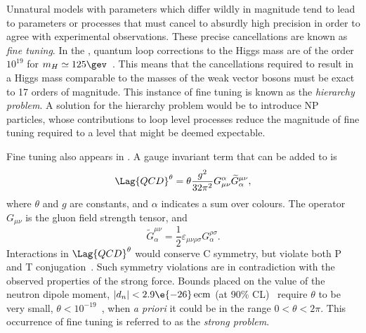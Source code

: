 Unnatural models with parameters which differ wildly in magnitude tend to
lead to parameters or processes that must cancel to absurdly
high precision in order to agree with experimental observations.
These precise cancellations are known as \emph{fine tuning}.
In the \sm, quantum loop corrections to the Higgs mass are of the order $10^{19}$
for $m_H\simeq125\gev$~\cite{Chatrchyan:2012ufa,Aad:2012tfa}.
This means that the cancellations required to result in a Higgs mass comparable to the masses of
the weak vector bosons must be exact to 17 orders of magnitude.
This instance of fine tuning is known as the \emph{hierarchy problem}.
A solution for the hierarchy problem would be to introduce NP particles, whose contributions to
loop level processes reduce the magnitude of fine tuning required to a level that might be deemed
expectable.

Fine tuning also appears in \QCD.
A gauge invariant term that can be added to  is
\begin{equation}
  \Lag{QCD}^\theta = \theta\frac{g^2}{32\pi^2}
  G_{\mu\nu}^\alpha\widetilde G^{\mu\nu}_\alpha,
  \label{eq:strongcp}
\end{equation}
where $\theta$ and $g$ are constants, and $\alpha$ indicates a sum over colours.
The operator $G_{\mu\nu}$ is the gluon field strength tensor, and
\begin{equation}
  \widetilde G^{\mu\nu}_\alpha = \frac12\varepsilon_{\mu\nu\rho\sigma}G^{\rho\sigma}_\alpha.
\end{equation}
Interactions in $\Lag{QCD}^\theta$ would conserve \gls{C} symmetry, but violate both \gls{P} and
\gls{T} conjugation~\cite{Peccei:2006as}.
Such symmetry violations are in contradiction with the observed properties of the strong
force.
Bounds placed on the value of the neutron dipole moment, $|d_n| <2.9\e{-26}\,\mathrm{ecm}$
(at 90\% CL)~\cite{Baker:2006ts} require $\theta$ to be very small,
$\theta<10^{-19}$~\cite{Crewther:PQref9}, when \emph{a priori} it could be in the range
$0<\theta<2\pi$.
This occurrence of fine tuning is referred to as the \emph{strong \CP problem}.

